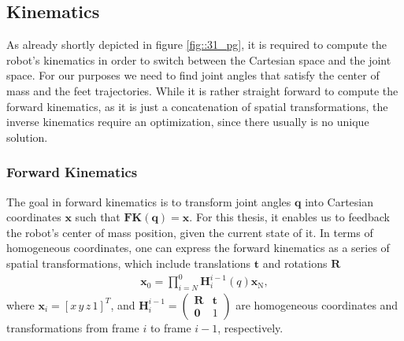 \subsection{Kinematics}
\label{sec::314_k}
As already shortly depicted in figure \ref{fig::31_pg}, it is required to compute the robot's kinematics in order to switch between the Cartesian space and the joint space. For our purposes we need to find joint angles that satisfy the center of mass and the feet trajectories. While it is rather straight forward to compute the forward kinematics, as it is just a concatenation of spatial transformations, the inverse kinematics require an optimization, since there usually is no unique solution.
\subsubsection{Forward Kinematics}
\label{sec::3141_fk}
The goal in forward kinematics is to transform joint angles $\bm{q}$ into Cartesian coordinates $\bm{x}$ such that $\textbf{FK}(\bm{q}) = \bm{x}$. For this thesis, it enables us to feedback the robot's center of mass position, given the current state of it. In terms of homogeneous coordinates, one can express the forward kinematics as a series of spatial transformations, which include translations $\bm{t}$ and rotations $\bm{R}$ 
\begin{align}
	\bm{x}_\text{0} = \prod_{i=N}^{0}\bm{H}_i^{i-1}(q)\bm{x}_\text{N},
\end{align}
where $\bm{x}_i=[x\,y\,z\,1]^T$, and $\bm{H}_i^{i-1}=\begin{pmatrix}\bm{R} & \bm{t} \\ \bm{0} & 1 \end{pmatrix}$ are homogeneous coordinates and transformations from frame $i$ to frame $i-1$, respectively.
